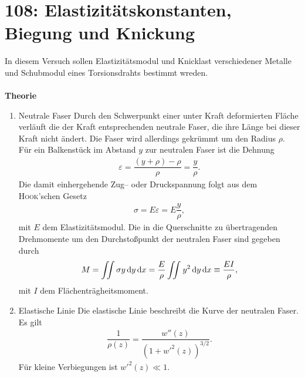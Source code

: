 \newpage
\section{108: Elastizitätskonstanten, Biegung und Knickung}
In diesem Versuch sollen Elastizitätsmodul und Knicklast verschiedener Metalle und Schubmodul eines Torsionsdrahts bestimmt wreden.\\\\
\textbf{Theorie} 
\begin{enumerate}[label=--]
        \item Neutrale Faser \hspace{25pt} 
                Durch den Schwerpunkt einer unter Kraft deformierten Fläche verläuft die der Kraft entsprechenden neutrale Faser, die ihre Länge bei dieser Kraft nicht ändert.
                Die Faser wird allerdings gekrümmt um den Radius $\rho $. 
                Für ein Balkenstück im Abstand $y$ zur neutralen Faser ist die Dehnung
                \begin{align} 
                        \varepsilon =\dfrac{\left(y+\rho \right)-\rho }{\rho }=\dfrac{y}{\rho }
                .\end{align} 
                Die damit einhergehende Zug-- oder Druckspannung folgt aus dem \textsc{Hook}'schen Gesetz
                \begin{align} 
                        \sigma =E\varepsilon =E\dfrac{y}{\rho }
                ,\end{align} 
                mit $E$ dem Elastizitätsmodul.
                Die in die Querschnitte zu übertragenden Drehmomente um den Durchstoßpunkt der neutralen Faser sind gegeben durch
                \begin{align} 
                        M=\iint\sigma y\,\text{d} y\,\text{d} x=\dfrac{E}{\rho }\iint_{}^{}y^2\,\text{d} y\,\text{d} x\equiv \dfrac{EI}{\rho }
                ,\end{align} 
                mit $I$ dem Flächenträgheitsmoment.
        \item Elastische Linie \hspace{25pt} 
                Die elastische Linie beschreibt die Kurve der neutralen Faser. 
                Es gilt
                \begin{align} 
                        \dfrac{1}{\rho \left(z\right)}=\dfrac{w''\left(z\right)}{\left(1+w'^2\left(z\right)\right)^{3/2}}
                .\end{align} 
                Für kleine Verbiegungen ist $w'^2\left(z\right)\ll 1$. 

\end{enumerate}
